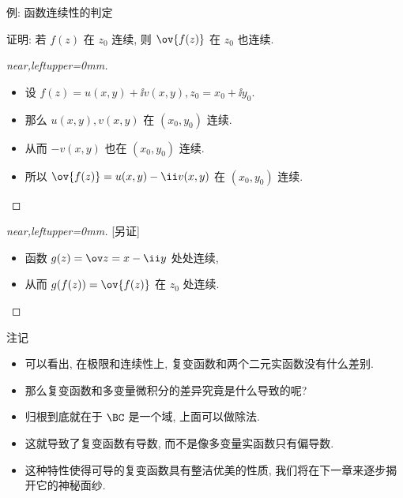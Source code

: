 \begin{frame}{例: 函数连续性的判定}
	\onslide<+->
	\begin{example}[near]
		证明: 若 $f(z)$ 在 $z_0$ 连续, 则 $\ov{f(z)}$ 在 $z_0$ 也连续.
	\end{example}
	\onslide<+->
	\begin{proof}[near,leftupper=0mm]
		\begin{itemize}
			\item 设 $f(z)=u(x,y)+\ii v(x,y),z_0=x_0+\ii y_0$.
			\item 那么 $u(x,y),v(x,y)$ 在 $(x_0,y_0)$ 连续.
			\item 从而 $-v(x,y)$ 也在 $(x_0,y_0)$ 连续.
			\item 所以 $\ov{f(z)}=u(x,y)-\ii v(x,y)$ 在 $(x_0,y_0)$ 连续.\qedhere
		\end{itemize}
	\end{proof}
	\onslide<+->
	\begin{proof}[near,leftupper=0mm][另证]
		\begin{itemize}
			\item 函数 $g(z)=\ov z=x-\ii y$ 处处连续,
			\item 从而 $g(f(z))=\ov{f(z)}$ 在 $z_0$ 处连续.\qedhere
		\end{itemize}
	\end{proof}
\end{frame}


\begin{frame}{注记}
	\begin{itemize}
		\item 可以看出, 在极限和连续性上, 复变函数和两个二元实函数没有什么差别.
		\item 那么复变函数和多变量微积分的差异究竟是什么导致的呢?
		\item 归根到底就在于 $\BC$ 是一个域, 上面可以做除法.
		\item 这就导致了复变函数有\alert{导数}, 而不是像多变量实函数只有偏导数.
		\item 这种特性使得可导的复变函数具有整洁优美的性质, 我们将在下一章来逐步揭开它的神秘面纱.
	\end{itemize}
\end{frame}

